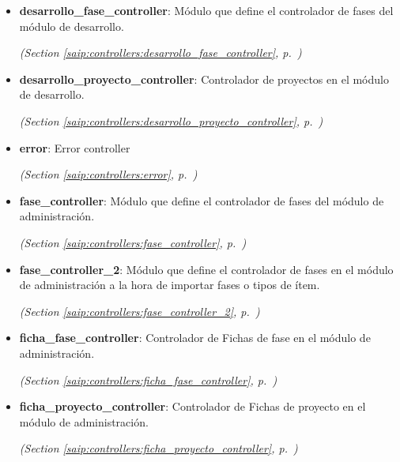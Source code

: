 \begin{itemize}
\item \textbf{desarrollo\_fase\_controller}: Módulo que define el controlador de fases del módulo de desarrollo.



  \textit{(Section \ref{saip:controllers:desarrollo_fase_controller}, p.~\pageref{saip:controllers:desarrollo_fase_controller})}

\item \textbf{desarrollo\_proyecto\_controller}: Controlador de proyectos en el módulo de desarrollo.



  \textit{(Section \ref{saip:controllers:desarrollo_proyecto_controller}, p.~\pageref{saip:controllers:desarrollo_proyecto_controller})}

\item \textbf{error}: Error controller



  \textit{(Section \ref{saip:controllers:error}, p.~\pageref{saip:controllers:error})}

\item \textbf{fase\_controller}: Módulo que define el controlador de fases del módulo de administración.



  \textit{(Section \ref{saip:controllers:fase_controller}, p.~\pageref{saip:controllers:fase_controller})}

\item \textbf{fase\_controller\_2}: Módulo que define el controlador de fases en el módulo de administración a 
la hora de importar fases o tipos de ítem.



  \textit{(Section \ref{saip:controllers:fase_controller_2}, p.~\pageref{saip:controllers:fase_controller_2})}

\item \textbf{ficha\_fase\_controller}: Controlador de Fichas de fase en el módulo de administración.



  \textit{(Section \ref{saip:controllers:ficha_fase_controller}, p.~\pageref{saip:controllers:ficha_fase_controller})}

\item \textbf{ficha\_proyecto\_controller}: Controlador de Fichas de proyecto en el módulo de administración.



  \textit{(Section \ref{saip:controllers:ficha_proyecto_controller}, p.~\pageref{saip:controllers:ficha_proyecto_controller})}


\end{itemize}
